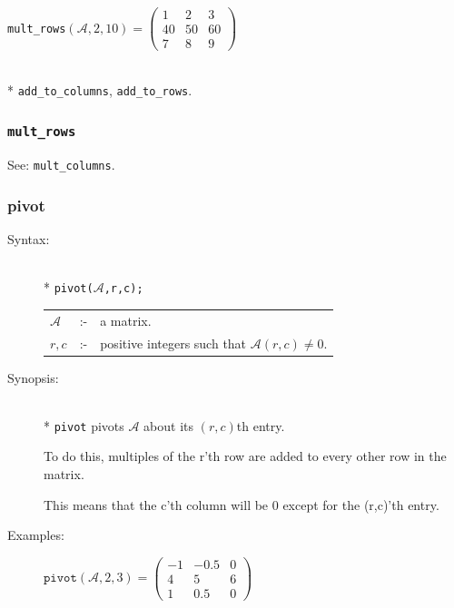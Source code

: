{\begin{description}
  \texttt{mult\_rows}\((\mathcal{A},2,10)  =
  \begin{pmatrix} 1 & 2 & 3 \\ 40 & 50 & 60 \\ 7 & 8 & 9 \end{pmatrix}\)

\item[Related functions:]\mbox{}\\*
\texttt{add\_to\_columns}, \texttt{add\_to\_rows}.
\end{description}


\subsubsection{\texttt{mult\_rows}}
\label{linalg:mult_rows}
\hypertarget{operator:MULT_ROWS}{}
See: \texttt{mult\_columns}.


\subsubsection{pivot}
\label{linalg:pivot}
\hypertarget{operator:PIVOT}{}

\begin{description}
\item[Syntax:]\mbox{}\\*
{\tt pivot($\mathcal{A}$,r,c);}\\[2mm]
\begin{tabular}{l l l}
$\mathcal{A}$ &:-& a matrix. \\
$r,c$        &:-& positive integers such that $\mathcal{A}(r,c) \neq 0$.
\end{tabular}

\item[Synopsis:]\mbox{}\\*
\texttt{pivot} pivots $\mathcal{A}$ about its $(r,c)$th entry.

To do this, multiples of the r'th row are added to every
     other row in the matrix.

This means that the c'th column
                will be 0 except for the (r,c)'th entry.

\item[Examples:]
\begin{flushleft}
\(
\texttt{pivot}(\mathcal{A},2,3) =
        \begin{pmatrix} -1 & -0.5 & 0 \\ 4 & 5 & 6 \\ 1 & 0.5 & 0 \end{pmatrix}
\)
\end{flushleft}


\end{description}}
